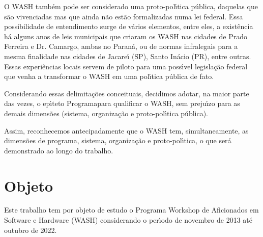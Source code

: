 \documentclass[
12pt,		%
openright,	%
twoside,  %
a4paper,			%
chapter=TITLE,		%
english,			%
french,				%
spanish,			%
brazil				%
]{USPSC-classe/USPSC}
\begin{document}
O WASH tamb\'em pode ser considerado uma proto-pol\'{\i}tica p\'ublica, daquelas que s\~ao vivenciadas mas que ainda n\~ao est\~ao formalizadas numa lei federal. Essa possibilidade de entendimento surge de v\'arios elementos, entre eles, a exist\^encia h\'a alguns anos de leis municipais que criaram os WASH nas cidades de Prado Ferreira e Dr. Camargo, ambas no Paran\'a, ou de normas infralegais para a mesma finalidade nas cidades de Jacare\'{\i} (SP), Santo In\'acio (PR), entre outras. Essas experi\^encias locais servem de piloto para uma poss\'{\i}vel legisla\c{c}\~ao federal que venha a transformar o WASH em uma pol\'{\i}tica p\'ublica de fato.

















Considerando essas delimita\c{c}\~oes conceituais, decidimos adotar, na maior parte das vezes, o ep\'{\i}teto \textquotedbl Programa\textquotedbl  para qualificar o WASH, sem preju\'{\i}zo para as demais dimens\~oes (sistema, organiza\c{c}\~ao e proto-pol\'{\i}tica p\'ublica).

















Assim, reconhecemos antecipadamente que o WASH tem, simultaneamente, as dimens\~oes de programa, sistema, organiza\c{c}\~ao e proto-pol\'{\i}tica, o que ser\'a demonstrado ao longo do trabalho.

















\section[Objeto]{Objeto}\label{Objeto}
Este trabalho tem por objeto de estudo o Programa Workshop de Aficionados em Software e Hardware (WASH) considerando o per\'{\i}odo de  novembro de 2013 at\'e outubro de 2022.
\end{document}
